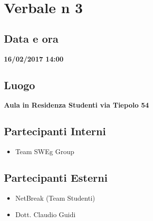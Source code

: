 \documentclass[12pt,a4paper,titlepage]{article}
\begin{document}
\section{Verbale n 3}
\subsection{Data e ora}
\begin{center}
\textbf{16/02/2017 14:00}
\subsection{Luogo}
\textbf{Aula in Residenza Studenti via Tiepolo 54}
\end{center}
\subsection{Partecipanti Interni}
\begin{itemize}
	\item Team SWEg Group
\end{itemize}
\subsection{Partecipanti Esterni}
\begin{itemize}
	\item NetBreak (Team Studenti)
	\item Dott. Claudio Guidi
\end{itemize}
\end{document}
